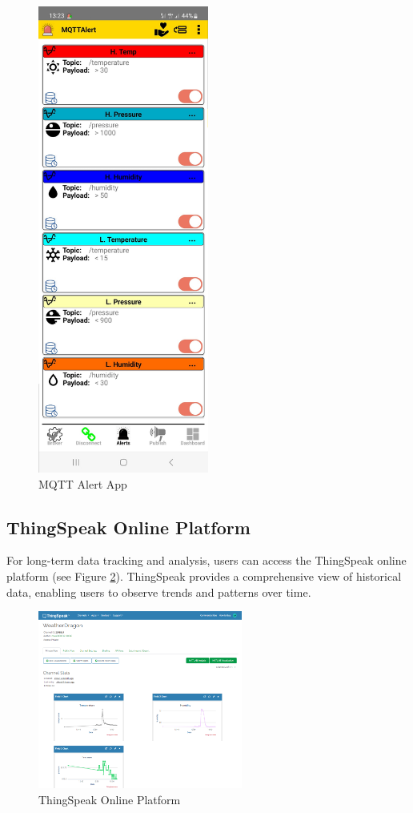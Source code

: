 \documentclass[titlepage]{article}
\begin{document}
\begin{figure}[ht]
\begin{minipage}{0.48\textwidth}
        \includegraphics[width=0.5\textwidth]{img/App-Alert.jpg}
        \caption{MQTT Alert App}
        \label{fig:app-alert}
    \end{minipage}
\end{figure}

\newpage
\subsection{ThingSpeak Online Platform}
For long-term data tracking and analysis, users can access the ThingSpeak online platform (see Figure \ref{fig:thingspeak}). ThingSpeak provides a comprehensive view of historical data, enabling users to observe trends and patterns over time.


\begin{figure}[ht]
    \centering
    \includegraphics[width=0.6\textwidth]{img/thingspeak.png}
    \caption{ThingSpeak Online Platform}
    \label{fig:thingspeak}
\end{figure}
\end{document}

